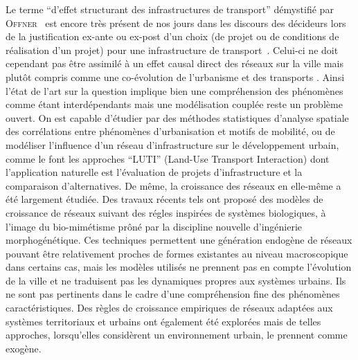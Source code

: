 \documentclass[french,12pt]{article}
\newcommand{\noun}[1]{\textsc{#1}}
\begin{document}
Le terme ``d'effet structurant des infrastructures de transport'' démystifié par \noun{Offner}~\cite{offner1993effets} est encore très présent de nos jours dans les discours des décideurs lors de la justification ex-ante ou ex-post d'un choix (de projet ou de conditions de réalisation d'un projet) pour une infrastructure de transport~\cite{confMangin}. %
Celui-ci ne doit cependant pas être assimilé à un effet causal direct des réseaux sur la ville mais plutôt compris comme une co-évolution de l'urbanisme et des transports \cite{bretagnolle:tel-00459720}. Ainsi l'état de l'art sur la question implique bien une compréhension des phénomènes comme étant interdépendants mais une modélisation couplée reste un problème ouvert. On est capable d'étudier par des méthodes statistiques d'analyse spatiale des corrélations entre phénomènes d'urbanisation et motifs de mobilité, ou de modéliser l'influence d'un réseau d'infrastructure sur le développement urbain, comme le font les approches ``LUTI'' (Land-Use Transport Interaction) \cite{wegener2004land,chang2006models} dont l'application naturelle est l'évaluation de projets d'infrastructure \cite{geurs2004land} et la comparaison d'alternatives. De même, la croissance des réseaux en elle-même a été largement étudiée. Des travaux récents tels \cite{TeroAl10} ont proposé des modèles de croissance de réseaux suivant des régles inspirées de systèmes biologiques, à l'image du bio-mimétisme prôné par la discipline nouvelle d'ingénierie morphogénétique. Ces techniques permettent une génération endogène de réseaux pouvant être relativement proches de formes existantes au niveau macroscopique dans certains cas, mais les modèles utilisés ne prennent pas en compte l'évolution de la ville et ne traduisent pas les dynamiques propres aux systèmes urbains. Ils ne sont pas pertinents dans le cadre d'une compréhension fine des phénomènes caractéristiques. Des règles de croissance empiriques de réseaux adaptées aux systèmes territoriaux et urbains ont également été explorées \cite{xie2009modeling} mais de telles approches, lorsqu'elles considèrent un environnement urbain, le prennent comme exogène.

\bigskip
\end{document}
